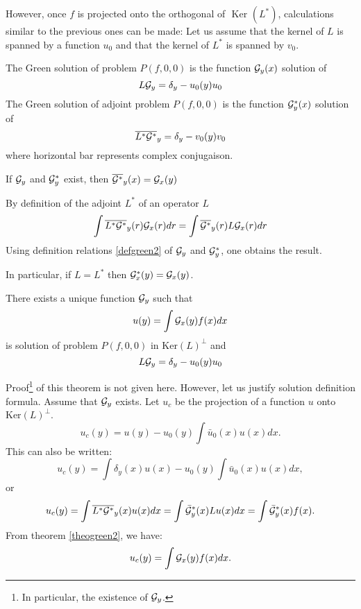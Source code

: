 \documentclass[12pt]{book}
\begin{document}
However, once $f$ is projected onto the orthogonal of $\mbox{ Ker }(L^*)$, 
calculations similar to the previous ones can be made: Let us assume that the
kernel of $L$ is spanned by a function $u_0$ and that the kernel of
$L^*$ is spanned by $v_0$.
\begin{defn}\label{defgreen2}
The Green solution of problem $P(f,0,0)$ is the function
${\cal G}_y(x)$ solution of
\begin{equation}
L{\cal G}_y=\delta_y-u_0(y)u_0
\end{equation}
The Green solution of adjoint problem $P(f,0,0)$ is the function
${\cal G}^*_y(x)$ solution of
\begin{equation}
\overline{L^*{\cal G}^*}_y=\delta_y-v_0(y)v_0
\end{equation}
where horizontal bar represents complex conjugaison.
\end{defn}
\begin{thm}\label{theogreen2}
If ${\cal G}_y$ and ${\cal G}^*_y$ exist, then
$\overline{{\cal G}^*}_y(x)= {\cal G}_x(y)$
\end{thm}
\begin{pf}
By definition of the adjoint $L^*$ of an operator $L$
\begin{equation}
\int \overline{L^*{\cal G^*}}_y(r){\cal G}_x(r)dr=\int \overline{{\cal G^*}}_{y}(r)L{\cal G}_x(r)dr
\end{equation}
Using definition relations \ref{defgreen2}
of ${\cal G}_y$ and ${\cal G}^*_y$, one obtains the result.
\end{pf}
In particular, if $L=L^*$ then ${\cal G}^*_x(y)= {\cal G}_x(y)$.
\begin{thm}
There exists a unique function ${\cal G}_y$ such that
\begin{equation}
u(y)=\int {\cal G}_x(y) f(x)dx
\end{equation}
is solution of problem $P(f,0,0)$ in $\mbox{Ker}(L)^\perp$ and
\begin{equation}
L{\cal G}_y=\delta_y-u_0(y)u_0
\end{equation}
\end{thm}
Proof\footnote{In particular, the existence of  ${\cal G}_y$.} of this
theorem is not given here. However, let us justify 
solution definition formula. Assume that ${\cal G}_y$ exists.
Let $u_c$ be the projection of a function $u$ onto $\mbox{Ker}(L)^\perp$.
\begin{equation}
u_c(y)=u(y)-u_0(y)\int \bar{u}_0(x)u(x) dx.
\end{equation}
This can also be written:
\begin{equation}
u_c(y)=\int \delta_y(x)u(x)-u_0(y)\int \bar{u}_0(x)u(x) dx,
\end{equation}
or
\begin{equation}
u_c(y)=\int \overline{L^*{\cal G}^*}_y(x) u(x)dx=\int \bar{\cal G}^*_y(x) Lu(x)dx=\int \bar{\cal G}^*_y(x) f(x).
\end{equation}
From theorem \ref{theogreen2}, we have:
\begin{equation}
u_c(y)=\int {\cal G}_x(y) f(x)dx.
\end{equation}
\end{document}
